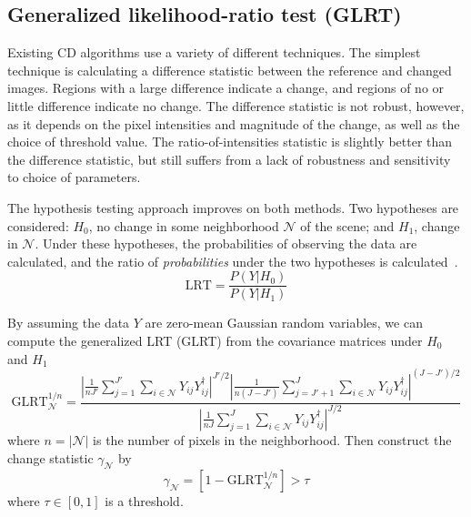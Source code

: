 \documentclass{article}
\begin{document}
\subsection{Generalized likelihood-ratio test (GLRT)}

Existing CD algorithms use a variety of different techniques. The simplest technique is calculating a difference statistic between the reference and changed images. Regions with a large difference indicate a change, and regions of no or little difference indicate no change. The difference statistic is not robust, however, as it depends on the pixel intensities and magnitude of the change, as well as the choice of threshold value. The ratio-of-intensities statistic is slightly better than the difference statistic, but still suffers from a lack of robustness and sensitivity to choice of parameters.

The hypothesis testing approach improves on both methods. Two hypotheses are considered: $H_0$, no change in some neighborhood $\mathcal{N}$ of the scene; and $H_1$, change in $\mathcal{N}$. Under these hypotheses, the probabilities of observing the data are calculated, and the ratio of \emph{probabilities} under the two hypotheses is calculated~\cite{novak_2005}.
\begin{equation}
    \text{LRT} = \frac{P(Y | H_0)}{P(Y | H_1)}
\end{equation}

By assuming the data $Y$ are zero-mean Gaussian random variables, we can compute the generalized LRT (GLRT) from the covariance matrices under $H_0$ and $H_1$
\begin{equation}\label{eq:glrt}
    \text{GLRT}^{1/n}_{\mathcal{N}} = \frac{
        \left|\frac{1}{nJ'} \sum_{j=1}^{J'} \sum_{i \in \mathcal{N}}
                    Y_{ij}Y_{ij}^\dagger \right|^{J'/2} %
        \left|\frac{1}{n(J-J')} \sum_{j=J'+1}^{J} \sum_{i \in \mathcal{N}}
                    Y_{ij}Y_{ij}^\dagger \right|^{(J-J')/2}}%
        {\left|\frac{1}{nJ} \sum_{j=1}^J \sum_{i \in \mathcal{N}}
                    Y_{ij}Y_{ij}^\dagger \right|^{J/2}} %
\end{equation}
where $n = |\mathcal{N}|$ is the number of pixels in the neighborhood. Then construct the change statistic $\gamma_\mathcal{N}$ by
\begin{equation}
    \gamma_\mathcal{N} = \left[ 1-\text{GLRT}^{1/n}_{\mathcal{N}} \right] > \tau
\end{equation}
where $\tau \in [0,1]$ is a threshold.
\end{document}
